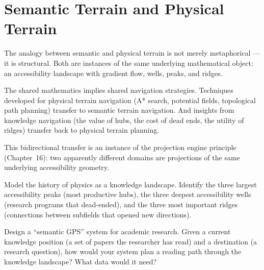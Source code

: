 \section{Semantic Terrain and Physical Terrain}

The analogy between semantic and physical terrain is not merely
metaphorical — it is structural. Both are instances of the same
underlying mathematical object: an accessibility landscape with
gradient flow, wells, peaks, and ridges.

The shared mathematics implies shared navigation strategies. Techniques
developed for physical terrain navigation (A* search, potential fields,
topological path planning) transfer to semantic terrain navigation.
And insights from knowledge navigation (the value of hubs, the cost
of dead ends, the utility of ridges) transfer back to physical terrain
planning.

This bidirectional transfer is an instance of the projection engine
principle (Chapter~16): two apparently different domains are projections
of the same underlying accessibility geometry.

\begin{exercise}
  Model the history of physics as a knowledge landscape. Identify the
  three largest accessibility peaks (most productive hubs),
  the three deepest accessibility wells (research programs that
  dead-ended), and the three most important ridges
  (connections between subfields that opened new directions).
\end{exercise}

\begin{exercise}
  Design a ``semantic GPS'' system for academic research. Given a
  current knowledge position (a set of papers the researcher has read)
  and a destination (a research question), how would your system
  plan a reading path through the knowledge landscape? What data
  would it need?
\end{exercise}
